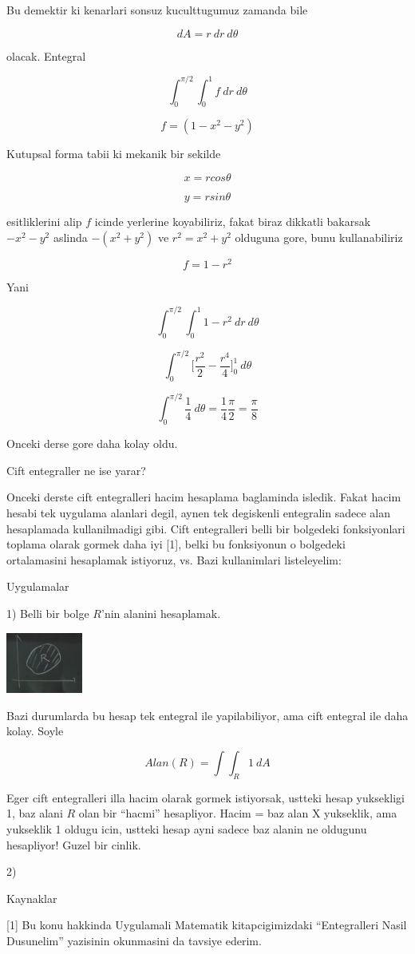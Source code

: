 \documentclass[12pt,fleqn]{article}
\begin{document}
Bu demektir ki kenarlari sonsuz kuculttugumuz zamanda bile 

\[ dA = r \ dr \ d\theta \]

olacak. Entegral

\[ \int_0^{\pi/2} \int_0^1  f \ dr \ d\theta\]

\[ f =  (1-x^2-y^2)\]

Kutupsal forma tabii ki mekanik bir sekilde

\[ x = rcos\theta \]

\[ y = rsin\theta \]

esitliklerini alip $f$ icinde yerlerine koyabiliriz, fakat biraz dikkatli
bakarsak $-x^2-y^2$ aslinda $-(x^2+y^2)$ ve $r^2=x^2+y^2$ olduguna gore,
bunu kullanabiliriz

\[ f =   1-r^2 \]

Yani

\[ \int_0^{\pi/2} \int_0^1  1-r^2 \ dr \ d\theta\]


\[ \int_0^{\pi/2}  \bigg[ \frac{r^2}{2} - \frac{r^4}{4} \bigg]_0^1 \ d\theta\]


\[ \int_0^{\pi/2}  \frac{1}{4} \ d\theta = \frac{1}{4} \frac{\pi}{2} =
\frac{\pi}{8}
\]

Onceki derse gore daha kolay oldu. 

Cift entegraller ne ise yarar? 

Onceki derste cift entegralleri hacim hesaplama baglaminda isledik. Fakat
hacim hesabi tek uygulama alanlari degil, aynen tek degiskenli entegralin
sadece alan hesaplamada kullanilmadigi gibi. Cift entegralleri
belli bir bolgedeki fonksiyonlari toplama olarak gormek daha iyi [1], belki bu
fonksiyonun o bolgedeki ortalamasini hesaplamak istiyoruz, vs. Bazi
kullanimlari listeleyelim:

Uygulamalar 

1) Belli bir bolge $R$'nin alanini hesaplamak. 

\includegraphics[height=2cm]{17_3.png}

Bazi durumlarda bu hesap tek entegral ile yapilabiliyor, ama cift entegral
ile daha kolay. Soyle

\[ Alan(R) = \int \int_R 1 \ dA \]

Eger cift entegralleri illa hacim olarak gormek istiyorsak, ustteki hesap
yuksekligi 1, baz alani $R$ olan bir ``hacmi'' hesapliyor. Hacim =  baz
alan X yukseklik, ama yukseklik 1 oldugu icin, ustteki hesap ayni sadece baz
alanin ne oldugunu hesapliyor! Guzel bir cinlik. 

2) 


Kaynaklar

[1] Bu konu hakkinda Uygulamali Matematik kitapcigimizdaki ``Entegralleri
Nasil Dusunelim'' yazisinin okunmasini da tavsiye ederim. 
\end{document}
